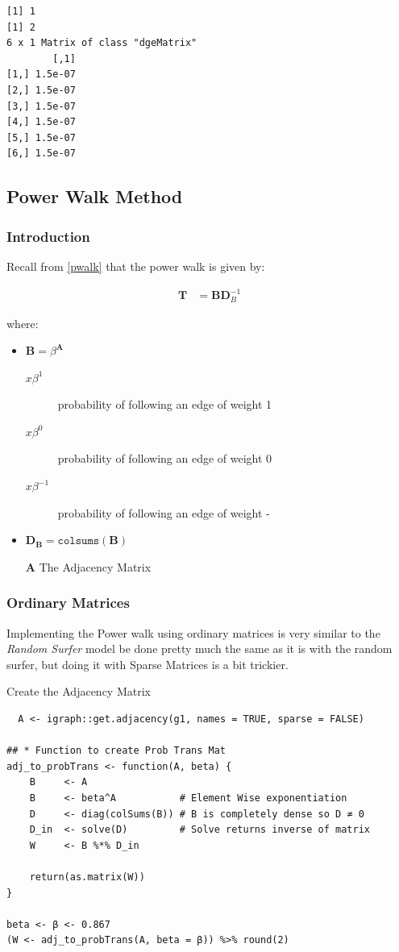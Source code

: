 \documentclass[11pt]{article}
\begin{document}
\begin{verbatim}
[1] 1
[1] 2
6 x 1 Matrix of class "dgeMatrix"
        [,1]
[1,] 1.5e-07
[2,] 1.5e-07
[3,] 1.5e-07
[4,] 1.5e-07
[5,] 1.5e-07
[6,] 1.5e-07
\end{verbatim}

\subsection{Power Walk Method}
\label{sec:orga9e31d7}
\subsubsection{Introduction}
\label{sec:org60a036e}
Recall from \ref{pwalk} that the power walk is given by:

\begin{align*}
\mathbf{T} &= \mathbf{B} \mathbf{D}^{-1}_{B}
\end{align*}



where:

\begin{itemize}
\item \(\mathbf{B}= \beta^{\mathbf{A}}\)
\begin{description}
\item[{\(x\beta^{1}\) }] probability of following an edge of weight 1
\item[{\(x\beta^{0}\) }] probability of following an edge of weight 0
\item[{\(x\beta^{-1}\)}] probability of following an edge of weight -
\end{description}
\item \(\mathbf{D}_{\mathbf{B}} = \mathtt{colsums}(\mathbf{B})\)
\item[{\(\mathbf{A}\)}] The Adjacency Matrix
\end{itemize}

\subsubsection{Ordinary Matrices}
\label{sec:org8e97f03}
Implementing the Power walk using ordinary matrices is very similar to the \emph{Random Surfer} model be done pretty much the same as it is with the random surfer, but doing it with Sparse Matrices is a bit trickier.

Create the Adjacency Matrix
\lstset{language=r,label= ,caption= ,captionpos=b,numbers=none}
\begin{lstlisting}
  A <- igraph::get.adjacency(g1, names = TRUE, sparse = FALSE)

## * Function to create Prob Trans Mat
adj_to_probTrans <- function(A, beta) {
    B     <- A
    B     <- beta^A           # Element Wise exponentiation
    D     <- diag(colSums(B)) # B is completely dense so D ≄ 0
    D_in  <- solve(D)         # Solve returns inverse of matrix
    W     <- B %*% D_in

    return(as.matrix(W))
}

beta <- β <- 0.867
(W <- adj_to_probTrans(A, beta = β)) %>% round(2)
\end{lstlisting}
\end{document}
